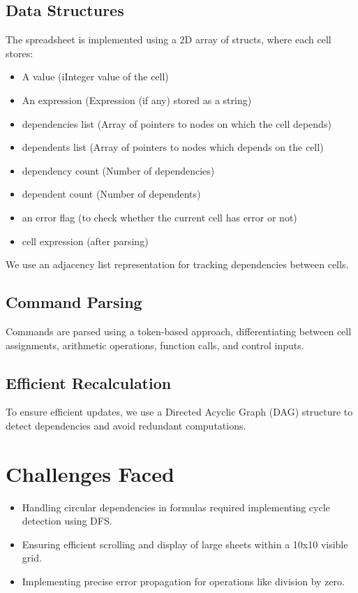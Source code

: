 \documentclass[a4paper,12pt]{article}
\begin{document}
\subsection{Data Structures}
The spreadsheet is implemented using a 2D array of structs, where each cell stores:
\begin{itemize}
    \item A value (iInteger value of the cell)
    \item An expression (Expression (if any) stored as a string)
    \item dependencies list (Array of pointers to nodes on which the cell depends)
    \item dependents list (Array of pointers to nodes which depends on the cell)
    \item dependency count (Number of dependencies)
    \item dependent count (Number of dependents)
    \item an error flag (to check whether the current cell has error or not)
    \item cell expression (after parsing)
\end{itemize}
We use an adjacency list representation for tracking dependencies between cells.

\subsection{Command Parsing}
Commands are parsed using a token-based approach, differentiating between cell assignments, arithmetic operations, function calls, and control inputs.

\subsection{Efficient Recalculation}
To ensure efficient updates, we use a Directed Acyclic Graph (DAG) structure to detect dependencies and avoid redundant computations.

\section{Challenges Faced}
\begin{itemize}
    \item Handling circular dependencies in formulas required implementing cycle detection using DFS.
    \item Ensuring efficient scrolling and display of large sheets within a 10x10 visible grid.
    \item Implementing precise error propagation for operations like division by zero.
\end{itemize}
\end{document}
